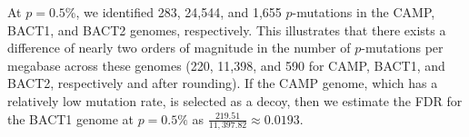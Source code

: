 At $p=0.5$\%, we identified 283, 24,544, and 1,655 $p$-mutations in the CAMP, BACT1, and BACT2 genomes, respectively. This illustrates that there exists a difference of nearly two orders of magnitude in the number of $p$-mutations per megabase across these genomes (220, 11,398, and 590 for CAMP, BACT1, and BACT2, respectively and after rounding). If the CAMP genome, which has a relatively low mutation rate, is selected as a decoy, then we estimate the FDR for the BACT1 genome at $p=0.5\%$ as $\frac{219.51}{11,397.82} \approx 0.0193$.\endinput